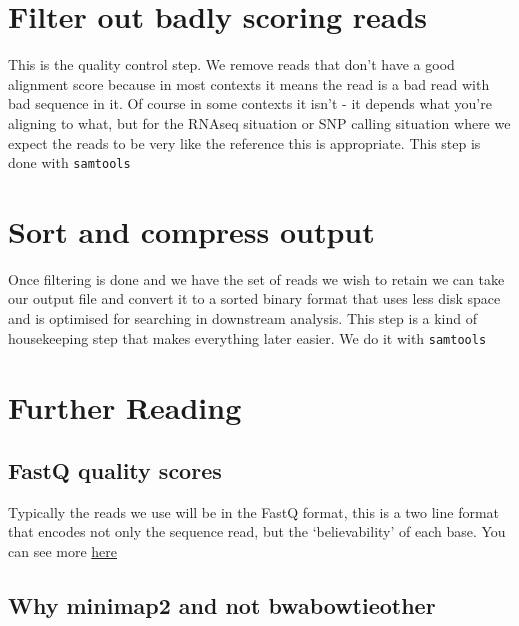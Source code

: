 \documentclass[]{book}
\begin{document}
\hypertarget{filter-out-badly-scoring-reads}{%
\section{Filter out badly scoring reads}\label{filter-out-badly-scoring-reads}}

This is the quality control step. We remove reads that don't have a good alignment score because in most contexts it means the read is a bad read with bad sequence in it. Of course in some contexts it isn't - it depends what you're aligning to what, but for the RNAseq situation or SNP calling situation where we expect the reads to be very like the reference this is appropriate. This step is done with \texttt{samtools}

\hypertarget{sort-and-compress-output}{%
\section{Sort and compress output}\label{sort-and-compress-output}}

Once filtering is done and we have the set of reads we wish to retain we can take our output file and convert it to a sorted binary format that uses less disk space and is optimised for searching in downstream analysis. This step is a kind of housekeeping step that makes everything later easier. We do it with \texttt{samtools}

\hypertarget{further-reading}{%
\section{Further Reading}\label{further-reading}}

\hypertarget{fastq-quality-scores}{%
\subsection{FastQ quality scores}\label{fastq-quality-scores}}

Typically the reads we use will be in the FastQ format, this is a two line format that encodes not only the sequence read, but the `believability' of each base. You can see more \href{https://en.wikipedia.org/wiki/FASTQ_format}{here}

\hypertarget{why-minimap2-and-not-bwabowtieother}{%
\subsection{Why minimap2 and not bwa\textbar{}bowtie\textbar{}other}\label{why-minimap2-and-not-bwabowtieother}}
\end{document}
